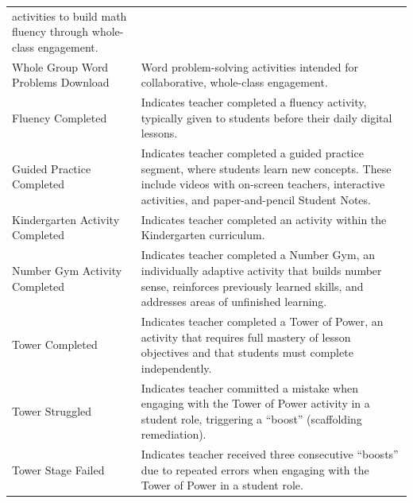 \documentclass[
  number,
  preprint,
  3p,
  onecolumn]{elsarticle}
\begin{document}
\begin{longtable}[]{@{}
  >{\raggedright\arraybackslash}p{}
  >{\raggedright\arraybackslash}p{}@{}}
activities to build math fluency through whole-class engagement. \\
Whole Group Word Problems Download \citep{zearnl} & Word problem-solving
activities intended for collaborative, whole-class engagement. \\
Fluency Completed \citep{lesson-a} & Indicates teacher completed a
fluency activity, typically given to students before their daily digital
lessons. \\
Guided Practice Completed \citep{zearnr} & Indicates teacher completed a
guided practice segment, where students learn new concepts. These
include videos with on-screen teachers, interactive activities, and
paper-and-pencil Student Notes. \\
Kindergarten Activity Completed \citep{zearns} & Indicates teacher
completed an activity within the Kindergarten curriculum. \\
Number Gym Activity Completed \citep{zearnt} & Indicates teacher
completed a Number Gym, an individually adaptive activity that builds
number sense, reinforces previously learned skills, and addresses areas
of unfinished learning. \\
Tower Completed \citep{zearnu} & Indicates teacher completed a Tower of
Power, an activity that requires full mastery of lesson objectives and
that students must complete independently. \\
Tower Struggled \citep{zearnac} & Indicates teacher committed a mistake
when engaging with the Tower of Power activity in a student role,
triggering a ``boost'' (scaffolding remediation). \\
Tower Stage Failed \citep{zearnad} & Indicates teacher received three
consecutive ``boosts'' due to repeated errors when engaging with the
Tower of Power in a student role. \\
\end{longtable}

\newpage{}
\end{document}
